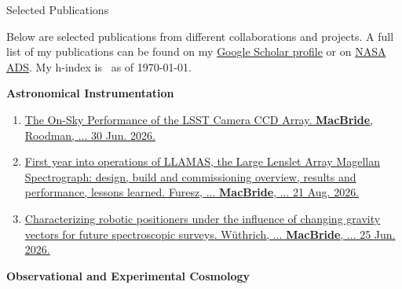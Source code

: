 \begin{rSection}{Selected Publications}

Below are selected publications from different collaborations and projects. A full list of my publications can be found on my \href{https://scholar.google.com/citations?user=XtRTswUAAAAJ&hl=en}{Google Scholar profile} or on \href{https://ui.adsabs.harvard.edu/search/fq=\%7B!type\%3Daqp\%20v\%3D\%24fq_database\%7D&fq_database=(database\%3Aastronomy\%20OR\%20database\%3Aphysics)&p_=0&q=((\%20author\%3A\%22Macbride\%2C\%20Sean\%22)\%20AND\%20year\%3A2019-2150)&sort=date\%20desc\%2C\%20bibcode\%20desc}{NASA ADS}. My h-index is \hindex\ as of \today.

\begin{rSubsection}{\textbf{Astronomical Instrumentation}}{}{}{}
\begin{enumerate}
    \item \href{https://arxiv.org/abs/2606.31806}{The On-Sky Performance of the LSST Camera CCD Array. \textbf{MacBride}, Roodman, ... 30 Jun. 2026.}
    \item \href{https://www.spiedigitallibrary.org/conference-proceedings-of-spie/14149/141491L/First-year-of-LLAMAS-the-large-lenslet-array-Magellan-spectrograph/10.1117/12.3104300.short}{First year into operations of LLAMAS, the Large Lenslet Array Magellan Spectrograph: design, build and commissioning overview, results and performance, lessons learned. Furesz, ... \textbf{MacBride}, ... 21 Aug. 2026.}
    \item  \href{https://arxiv.org/pdf/2606.26821}{Characterizing robotic positioners under the influence of changing gravity vectors for future spectroscopic surveys. Wüthrich, ... \textbf{MacBride}, ... 25 Jun. 2026.}
\end{enumerate}
\end{rSubsection}
\begin{rSubsection}{\textbf{Observational and Experimental Cosmology}}{}{}{}
\begin{enumerate}

\end{enumerate}
\end{rSubsection}
\end{rSection}
